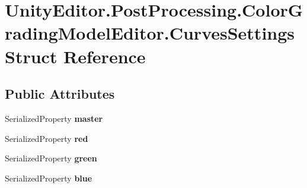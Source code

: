 \hypertarget{struct_unity_editor_1_1_post_processing_1_1_color_grading_model_editor_1_1_curves_settings}{}\section{Unity\+Editor.\+Post\+Processing.\+Color\+Grading\+Model\+Editor.\+Curves\+Settings Struct Reference}
\label{struct_unity_editor_1_1_post_processing_1_1_color_grading_model_editor_1_1_curves_settings}
\subsection*{Public Attributes}
\begin{DoxyCompactItemize}
\item 
\mbox{\label{struct_unity_editor_1_1_post_processing_1_1_color_grading_model_editor_1_1_curves_settings_ae6576a6673f4bed2c96d4674c8ba0e97}} 
Serialized\+Property {\bfseries master}
\item 
\mbox{\label{struct_unity_editor_1_1_post_processing_1_1_color_grading_model_editor_1_1_curves_settings_a6abaeb8fec7b6d99b791183e500be100}} 
Serialized\+Property {\bfseries red}
\item 
\mbox{\label{struct_unity_editor_1_1_post_processing_1_1_color_grading_model_editor_1_1_curves_settings_a1fa5436e8bb4a9ae9e96c1115604d742}} 
Serialized\+Property {\bfseries green}
\item 
\mbox{\label{struct_unity_editor_1_1_post_processing_1_1_color_grading_model_editor_1_1_curves_settings_a6dacf7fa475fd7ce1349419fc99c9d88}} 
Serialized\+Property {\bfseries blue}
\item 
\mbox{\label{struct_unity_editor_1_1_post_processing_1_1_color_grading_model_editor_1_1_curves_settings_a7512f21a1f8fb405647eb84b4dc4ade7}} 

\end{DoxyCompactItemize}
